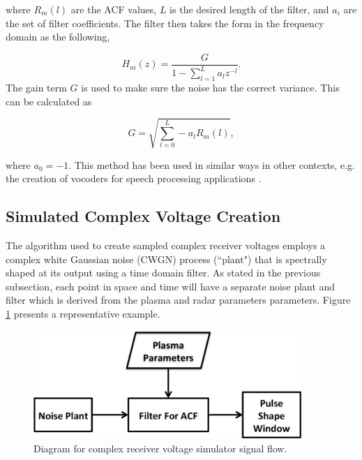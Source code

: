 \documentclass[draft,ras]{agutex}
\begin{document}
\begin{article}
\noindent where $R_m(l)$ are the ACF values, $L$ is the desired length of the filter, and $ a_i$ are the set of filter coefficients. The filter then takes the form in the frequency domain as the following,

\begin{equation}
\label{eq:filtz}
H_m(z) = \frac{G}{1-\displaystyle \sum_{l=1}^{L} a_l z^{-l}}.
\end{equation}
\noindent The gain term $G$ is used to make sure the noise has the correct variance. This can be calculated as 

\begin{equation}
\label{eq:gainterm}
G=\sqrt{\displaystyle \sum_{l=0}^L -a_l R_m(l)},
\end{equation}

\noindent where $a_0=-1$.  This method has been used in similar ways in other contexts, e.g. the creation of vocoders for speech processing applications \citep{rabinerdigitalspeech}.

\subsection{Simulated Complex Voltage Creation}

The algorithm used to create sampled complex receiver voltages employs a complex white Gaussian noise (CWGN) process (``plant") that is spectrally shaped at its output using a time domain filter. As stated in the previous subsection, each point in space and time will have a separate noise plant and filter which is derived from the plasma and radar parameters parameters.  Figure \ref{fig:IQdiagram} presents a representative example. 

\begin{figure}[h!]
\centering
\includegraphics[width=4in]{diagrampart}
\caption{Diagram for complex receiver voltage simulator signal flow.}
\label{fig:IQdiagram}
\end{figure}


\end{article}
\end{document}

